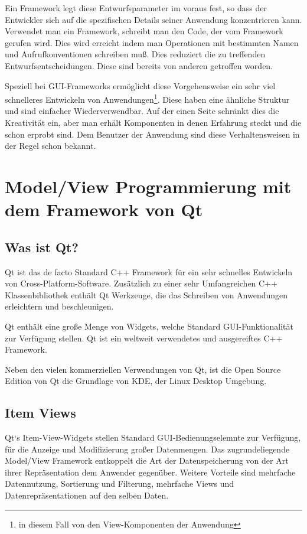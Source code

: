 \documentclass[11pt,a4paper,titlepage]{scrreprt}
\begin{document}
Ein Framework legt diese Entwurfsparameter im voraus fest, so dass der Entwickler
sich auf die spezifischen Details seiner Anwendung konzentrieren kann.
Verwendet man ein Framework, schreibt man den Code, der vom Framework gerufen wird.
Dies wird erreicht indem man Operationen mit bestimmten Namen und Aufrufkonventionen
schreiben muß. Dies reduziert die zu treffenden Entwurfsentscheidungen. Diese sind
bereits von anderen getroffen worden.

Speziell bei GUI-Frameworks ermöglicht diese Vorgehensweise ein sehr viel schnelleres
Entwickeln von Anwendungen\footnote{in diesem Fall von den View-Komponenten
der Anwendung}. Diese haben eine ähnliche Struktur und sind einfacher Wiederverwendbar.
Auf der einen Seite schränkt dies die Kreativität ein, aber man erhält Komponenten 
in denen Erfahrung steckt und die schon erprobt sind. Dem Benutzer der Anwendung sind
diese Verhaltensweisen in der Regel schon bekannt.

\chapter{Model/View Programmierung mit dem Framework von Qt}
\section{Was ist Qt?}
Qt ist das de facto Standard C++ Framework für ein sehr schnelles Entwickeln von
Cross-Platform-Software. Zusätzlich zu einer sehr Umfangreichen C++ Klassenbibliothek
enthält Qt Werkzeuge, die das Schreiben von Anwendungen erleichtern und
beschleunigen.

Qt enthält eine große Menge von Widgets, welche Standard GUI-Funktionalität zur
Verfügung stellen. Qt ist ein weltweit verwendetes und ausgereiftes C++ Framework.

Neben den vielen kommerziellen Verwendungen von Qt, ist die Open Source Edition
von Qt die Grundlage von KDE, der Linux Desktop Umgebung.

\section{Item Views}
Qt`s Item-View-Widgets stellen Standard GUI-Bedienungselemnte zur Verfügung, für die
Anzeige und Modifizierung großer Datenmengen. Das zugrundeliegende Model/View Framework
entkoppelt die Art der Datenspeicherung von der Art ihrer Repräsentation dem Anwender
gegenüber. Weitere Vorteile sind mehrfache Datennutzung, Sortierung und Filterung,
mehrfache Views und Datenrepräsentationen auf den selben Daten.
\end{document}
